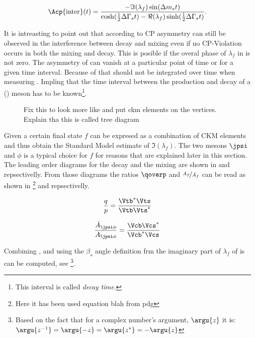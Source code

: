\newcommand{\half}{\frac{1}{2}}
\begin{equation}
  \Acp{\text{inter}}(t) = \frac{ - \Im(\lambda_f) \sin(\Delta m_s t)} {\cosh(\half \Delta\Gamma_s t) - \Re(\lambda_f)\sinh(\half\Delta\Gamma_s t)}.
\label{cpv_interf}
\end{equation}

\noindent It is intreasting to point out that according to  CP asymmetry can still be observed in the interference between decay and
mixing even if no CP-Violation occurs in both the mixing and decay. This is posible if the overal phase of $\lambda_f$ in  is not zero.
The asymmetry of  can vanish at a particular point of time or for a given time interval. Because of that  should not
be integrated over time when measuring \phis. Impling that the time interval between the production and decay of a \Bs (\Bsb) meson has to be
known\footnote{This interval is called {\it decay time}.}.

\begin{figure}[h]
  \centering
  {\sffamily }
  \caption{{\color{red} Fix this to look more like  and put ckm elements on the vertices}. Explain tha this is called tree diagram}
  \label{bs2jpsiphi}
\end{figure}

Given a certain final state $f$  can be expresed as a combination of CKM elements and thus obtain the
Standard Model estimate of $\Im(\lambda_f)$. The two mesons $\jpsi$ and $\phi$ is a typical choice for $f$ for reasons that are
explained later in this section. The leading order diagrams for the \BsJpsiPhi decay and the \BBbarSyst mixing are
shown in  and  repsectivelly. From those diagrams the ratios $\qoverp$ and $\nicefrac{A_f}{\bar{A}_{f}}$
can be read as shown in \footnote{Here it has been used {\color{red} equation blah from pdg} } and  repsectivelly.

\begin{equation}
 \frac{q}{p} = \frac{\Vtb^*\Vts}{\Vtb\Vts^*}
\label{qoverp}
\end{equation}

\begin{equation}
 \frac{\bar{A}_{\jpsi\phi}} {A_{\jpsi\phi}} = \frac{\Vcb\Vcs^*}{\Vcb^*\Vcs}
\label{af_afbar}
\end{equation}

\noindent Combining ,  and using the $\beta_s$ angle definition frm  the imaginary part of
$\lambda_{f}$ of  is can be computed, see \footnote{Based on the fact that for a complex number's argument, $\argu{z}$ it is: $\argu{z^{-1}}=\argu{-z}=\argu{z^*}=-\argu{z}$}.

